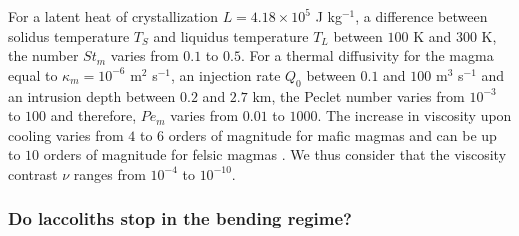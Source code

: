 For a latent heat of crystallization $L = 4.18\times10^5$ J kg$^{-1}$,
a   difference  between   solidus  temperature   $T_S$  and   liquidus
temperature  $T_L$ between  $100$ K  and  $300$ K,  the number  $St_m$
varies from $0.1$  to $0.5$.  For a thermal diffusivity  for the magma
equal to $\kappa_m=  10^{-6}$ m$^2$ s$^{-1}$, an  injection rate $Q_0$
between $0.1$ and $100$ m$^3$  s$^{-1}$ and an intrusion depth between
$0.2$ and $2.7$  km, the Peclet number varies from  $10^{-3}$ to $100$
and therefore,  $Pe_m$ varies from  $0.01$ to $1000$. The  increase in
viscosity upon cooling varies from $4$  to $6$ orders of magnitude for
mafic magmas  and can  be up  to $10$ orders  of magnitude  for felsic
magmas
\citep{Anonymous:CZVBrBvv,Lejeune:1995fc,Giordano:2008em,Diniega:2013eh}.
We  thus  consider  that  the viscosity  contrast  $\nu$  ranges  from
$10^{-4}$ to $10^{-10}$.

\subsubsection*{Do laccoliths stop in the bending regime?}
\label{C4-sec:do-laccoliths-stop}

